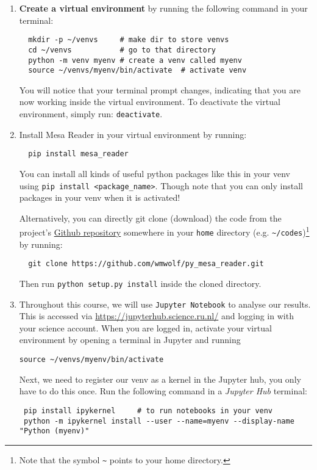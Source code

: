 \documentclass[11pt,a4paper]{article}
\begin{document}
\begin{enumerate}
  \item \textbf{Create a virtual environment} by running the following command in your terminal:
\begin{lstlisting}
  mkdir -p ~/venvs     # make dir to store venvs
  cd ~/venvs           # go to that directory
  python -m venv myenv # create a venv called myenv
  source ~/venvs/myenv/bin/activate  # activate venv
\end{lstlisting}
    You will notice that your terminal prompt changes, indicating that you are now working inside the virtual environment. To deactivate the virtual environment, simply run: \texttt{deactivate}.

    \item Install Mesa Reader in your virtual environment by running:
\begin{lstlisting}
  pip install mesa_reader
\end{lstlisting}
    You can install all kinds of useful python packages like this in your venv using \texttt{pip install <package\_name>}. Though note that you can only install packages in your venv when it is activated!

    Alternatively, you can directly git clone (download) the code from the project's \href{https://github.com/wmwolf/py_mesa_reader}{Github repository} somewhere in your \texttt{home} directory (e.g. \verb|~/codes|)\footnote{Note that the symbol \texttt{\~} points to your home directory.} by running:
\begin{lstlisting}
  git clone https://github.com/wmwolf/py_mesa_reader.git
\end{lstlisting}
    Then run \texttt{python setup.py install} inside the cloned directory.

\item
  Throughout this course, we will use \texttt{Jupyter Notebook} to analyse our results. This is accessed via \url{https://jupyterhub.science.ru.nl/} and logging in with your science account.
  When you are logged in, activate your virtual environment by opening a terminal in Jupyter and running 
\begin{lstlisting}
source ~/venvs/myenv/bin/activate 
\end{lstlisting}

  Next, we need to register our venv as a kernel in the Jupyter hub, you only have to do this once. Run the following command in a \textit{Jupyter Hub} terminal:

\begin{lstlisting}
 pip install ipykernel     # to run notebooks in your venv 
 python -m ipykernel install --user --name=myenv --display-name "Python (myenv)"
\end{lstlisting}


\end{enumerate}
\end{document}
